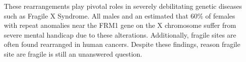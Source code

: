 \documentclass[phd,tocprelim]{cornell}
\begin{document}
These
rearrangements play pivotal roles in severely debilitating genetic diseases
such as Fragile X Syndrome.  All males and an estimated that 60\% of females
with repeat anomalies near the FRM1 gene on the X chromosome suffer
from severe mental handicap due to these alterations\cite{sutherland1995}.
Additionally, fragile sites are often found rearranged in human
cancers\cite{glover2005}.  Despite these findings, reason fragile site are
fragile is still an unanswered question.








%
%

\appendix
\appendixpage
\addappheadtotoc



%
%


%
%

{}


\printglossaries
\end{document}
